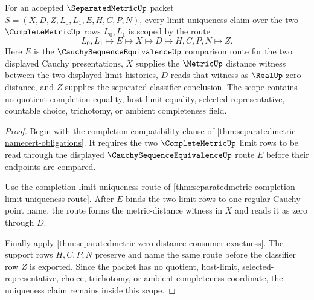 \begin{theorem}
\label{thm:separatedmetric-limit-uniqueness-scope}
For an accepted $\SeparatedMetricUp$ packet $S=(X,D,Z,L_0,L_1,E,H,C,P,N)$, every limit-uniqueness claim over the two $\CompleteMetricUp$ rows $L_0,L_1$ is scoped by the route
$$
L_0,L_1 \longmapsto E \longmapsto X \longmapsto D \longmapsto H,C,P,N \longmapsto Z .
$$
Here $E$ is the $\CauchySequenceEquivalenceUp$ comparison route for the two displayed Cauchy presentations, $X$ supplies the $\MetricUp$ distance witness between the two displayed limit histories, $D$ reads that witness as $\RealUp$ zero distance, and $Z$ supplies the separated classifier conclusion. The scope contains no quotient completion equality, host limit equality, selected representative, countable choice, trichotomy, or ambient completeness field.
\end{theorem}
\begin{proof}
Begin with the completion compatibility clause of \autoref{thm:separatedmetric-namecert-obligations}. It requires the two $\CompleteMetricUp$ limit rows to be read through the displayed $\CauchySequenceEquivalenceUp$ route $E$ before their endpoints are compared.

Use the completion limit uniqueness route of \autoref{thm:separatedmetric-completion-limit-uniqueness-route}. After $E$ binds the two limit rows to one regular Cauchy point name, the route forms the metric-distance witness in $X$ and reads it as zero through $D$.

Finally apply \autoref{thm:separatedmetric-zero-distance-consumer-exactness}. The support rows $H,C,P,N$ preserve and name the same route before the classifier row $Z$ is exported. Since the packet has no quotient, host-limit, selected-representative, choice, trichotomy, or ambient-completeness coordinate, the uniqueness claim remains inside this scope.
\end{proof}

